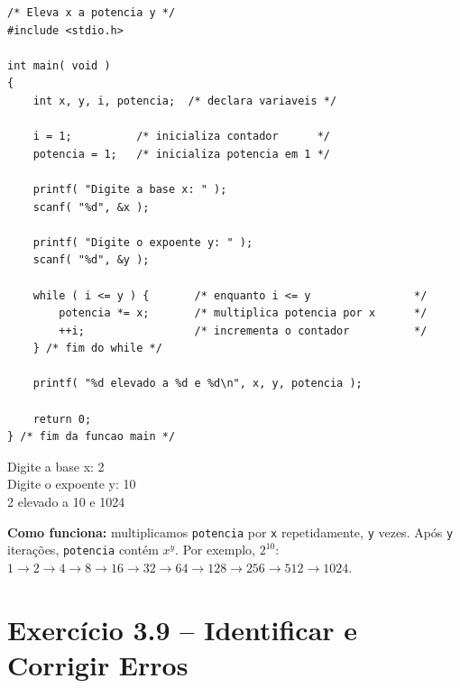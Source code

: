 \documentclass[12pt,a4paper]{article}
\begin{document}
\begin{respostabox}
\begin{lstlisting}
/* Eleva x a potencia y */
#include <stdio.h>

int main( void )
{
    int x, y, i, potencia;  /* declara variaveis */

    i = 1;          /* inicializa contador      */
    potencia = 1;   /* inicializa potencia em 1 */

    printf( "Digite a base x: " );
    scanf( "%d", &x );

    printf( "Digite o expoente y: " );
    scanf( "%d", &y );

    while ( i <= y ) {       /* enquanto i <= y                */
        potencia *= x;       /* multiplica potencia por x      */
        ++i;                 /* incrementa o contador          */
    } /* fim do while */

    printf( "%d elevado a %d e %d\n", x, y, potencia );

    return 0;
} /* fim da funcao main */
\end{lstlisting}

\begin{saida}
Digite a base x: 2\\
Digite o expoente y: 10\\
2 elevado a 10 e 1024
\end{saida}

\textbf{Como funciona:} multiplicamos \texttt{potencia} por \texttt{x} repetidamente,
\texttt{y} vezes. Após \texttt{y} iterações, \texttt{potencia} contém $x^y$.
Por exemplo, $2^{10}$: $1 \to 2 \to 4 \to 8 \to 16 \to 32 \to 64 \to 128 \to
256 \to 512 \to 1024$.
\end{respostabox}

\newpage

\section{Exercício 3.9 -- Identificar e Corrigir Erros}
\end{document}
